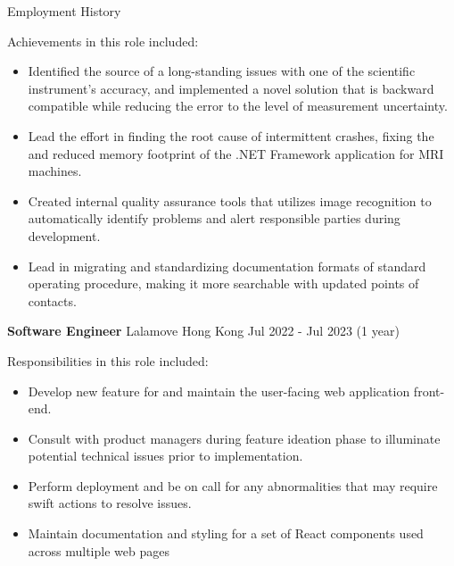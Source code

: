 \documentclass{resume} %
\begin{document}
\begin{rSection}{Employment History}
\begin{minipage}{.8\textwidth}
        Achievements in this role included:
        \begin{itemize}
            \item Identified the source of a long-standing issues with one of the scientific instrument's accuracy, and implemented a novel solution that is backward compatible while reducing the error to the level of measurement uncertainty.
            \item Lead the effort in finding the root cause of intermittent crashes, fixing the and reduced memory footprint of the .NET Framework application for MRI machines.
            \item Created internal quality assurance tools that utilizes image recognition to automatically identify problems and alert responsible parties during development.
            \item Lead in migrating and standardizing documentation formats of standard operating procedure, making it more searchable with updated points of contacts.
        \end{itemize}
    \end{minipage}%
    
    \clearpage

    \item \textbf{Software Engineer} {Lalamove Hong Kong} \hfill Jul 2022 - Jul 2023 (1 year)\\ 
    
    \hspace*{1cm}%
    \begin{minipage}{.8\textwidth}%
        
        Responsibilities in this role included:
        \begin{itemize}
            \item Develop new feature for and maintain the user-facing web application front-end.
            \item Consult with product managers during feature ideation phase to illuminate potential technical issues prior to implementation.
            \item Perform deployment and be on call for any abnormalities that may require swift actions to resolve issues.
            \item Maintain documentation and styling for a set of React components used across multiple web pages
        \end{itemize}
        

\end{minipage}
\end{rSection}
\end{document}
